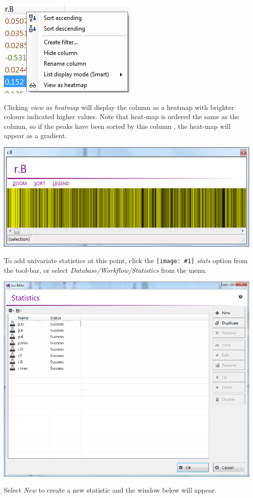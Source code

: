 \documentclass[11pt,a4paper]{article}
\newcommand{\menu}[1]{ \flqq\textit{#1}\frqq}
\newcommand{\icon}[1]{\texttt{[image: \#1]}}
\begin{document}
\begin{center}
	\includegraphics[max width=0.5\linewidth]{"Images/userguide/column header"}
\end{center}
Clicking \menu{view as heatmap} will display the column as a heatmap with brighter colours indicated higher values. Note that heat-map is ordered the same as the column, so if the peaks have been sorted by this column , the heat-map will appear as a gradient.

\begin{center}
\includegraphics[max width=0.7\linewidth]{Images/userguide/heatmap}
\end{center}
To add univariate statistics at this point, click the \icon{stats} \menu{stats} option from the tool-bar, or select \menu{Database/Workflow/Statistics} from the menu.

\begin{center}
\includegraphics[max width=0.7\linewidth]{"Images/userguide/statistics list"}
\end{center}
Select \menu{New} to create a new statistic and the window below will appear.
\end{document}

